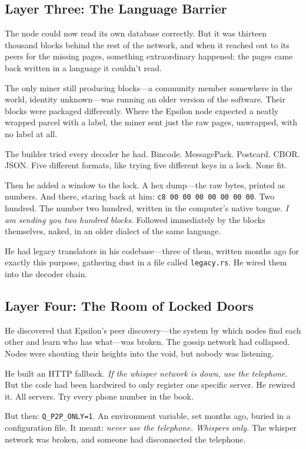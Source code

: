 \documentclass[11pt,a4paper]{article}
\begin{document}
\subsection*{Layer Three: The Language Barrier}

The node could now read its own database correctly. But it was thirteen thousand blocks behind the rest of the network, and when it reached out to its peers for the missing pages, something extraordinary happened: the pages came back written in a language it couldn't read.

The only miner still producing blocks---a community member somewhere in the world, identity unknown---was running an older version of the software. Their blocks were packaged differently. Where the Epsilon node expected a neatly wrapped parcel with a label, the miner sent just the raw pages, unwrapped, with no label at all.

The builder tried every decoder he had. Bincode. MessagePack. Postcard. CBOR. JSON. Five different formats, like trying five different keys in a lock. None fit.

Then he added a window to the lock. A hex dump---the raw bytes, printed as numbers. And there, staring back at him: \texttt{c8 00 00 00 00 00 00 00}. Two hundred. The number two hundred, written in the computer's native tongue. \textit{I am sending you two hundred blocks.} Followed immediately by the blocks themselves, naked, in an older dialect of the same language.

He had legacy translators in his codebase---three of them, written months ago for exactly this purpose, gathering dust in a file called \texttt{legacy.rs}. He wired them into the decoder chain.

\subsection*{Layer Four: The Room of Locked Doors}

He discovered that Epsilon's peer discovery---the system by which nodes find each other and learn who has what---was broken. The gossip network had collapsed. Nodes were shouting their heights into the void, but nobody was listening.

He built an HTTP fallback. \textit{If the whisper network is down, use the telephone.} But the code had been hardwired to only register one specific server. He rewired it. All servers. Try every phone number in the book.

But then: \texttt{Q\_P2P\_ONLY=1}. An environment variable, set months ago, buried in a configuration file. It meant: \textit{never use the telephone. Whispers only.} The whisper network was broken, and someone had disconnected the telephone.
\end{document}
